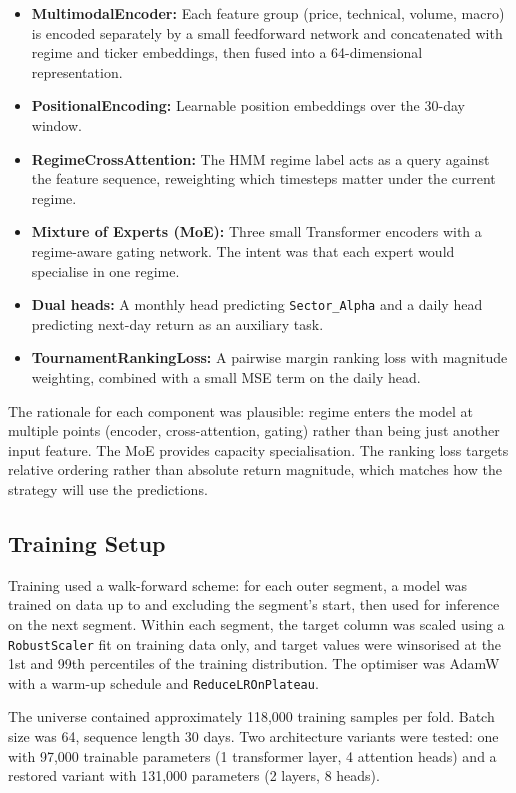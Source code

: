 \documentclass[conference]{IEEEtran}
\begin{document}
\begin{itemize}
    \item \textbf{MultimodalEncoder:} Each feature group (price, technical, volume, macro) is encoded separately by a small feedforward network and concatenated with regime and ticker embeddings, then fused into a 64-dimensional representation.
    \item \textbf{PositionalEncoding:} Learnable position embeddings over the 30-day window.
    \item \textbf{RegimeCrossAttention:} The HMM regime label acts as a query against the feature sequence, reweighting which timesteps matter under the current regime.
    \item \textbf{Mixture of Experts (MoE):} Three small Transformer encoders with a regime-aware gating network. The intent was that each expert would specialise in one regime.
    \item \textbf{Dual heads:} A monthly head predicting \texttt{Sector\_Alpha} and a daily head predicting next-day return as an auxiliary task.
    \item \textbf{TournamentRankingLoss:} A pairwise margin ranking loss with magnitude weighting, combined with a small MSE term on the daily head.
\end{itemize}

The rationale for each component was plausible: regime enters the model at multiple points (encoder, cross-attention, gating) rather than being just another input feature. The MoE provides capacity specialisation. The ranking loss targets relative ordering rather than absolute return magnitude, which matches how the strategy will use the predictions.

\subsection{Training Setup}

Training used a walk-forward scheme: for each outer segment, a model was trained on data up to and excluding the segment's start, then used for inference on the next segment. Within each segment, the target column was scaled using a \texttt{RobustScaler} fit on training data only, and target values were winsorised at the 1st and 99th percentiles of the training distribution. The optimiser was AdamW with a warm-up schedule and \texttt{ReduceLROnPlateau}.

The universe contained approximately 118{,}000 training samples per fold. Batch size was 64, sequence length 30 days. Two architecture variants were tested: one with 97{,}000 trainable parameters (1 transformer layer, 4 attention heads) and a restored variant with 131{,}000 parameters (2 layers, 8 heads).
\end{document}

